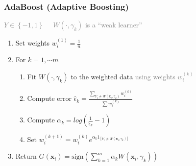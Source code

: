 \documentclass[xcolor={dvipsnames}]{beamer}
\begin{document}
\frame
{
 \frametitle{AdaBoost (Adaptive Boosting)}
 
\textcolor{gray}{$Y \in \left\{-1,1\right\} \quad$ $W(\cdot,\gamma_k)$ is a ``weak learner''} 
 \begin{enumerate}
 \item Set weights $w^{(1)}_i = \frac{1}{n}$

 \item<2-> For $k = 1, \cdots m$ \\ 
 \begin{enumerate}
\item<3-> Fit $W(\cdot,\gamma_k)$ to the weighted data \textcolor{gray}{using weights $w^{(k)}_i$} 
\item<4-> Compute error $\hat \epsilon_k = \frac{\underset{Y_i \not = W({\boldsymbol x}_i,\gamma_k)}{\sum} w^{(k)}_i }{\sum w^{(k)}_i}$ 
\item<5-> Compute $\alpha_k = log\left(\frac{1}{\hat \epsilon_k} - 1\right)$
\item<6-> Set $w_i^{(k+1)} = w_i^{(k)} e^{\alpha_k 1_{[Y_i \not = W({\boldsymbol x}_i,\gamma_k)]}}$
\end{enumerate}
\item<7-> Return $G({\boldsymbol x}_i) = \text{sign}\left(\sum_{k=1}^m \alpha_k W({\boldsymbol x}_i,\gamma_k)\right)$ 
\end{enumerate}
 
\begin{figure}
\centering
{}\\
\end{figure}
 
}
\end{document}
